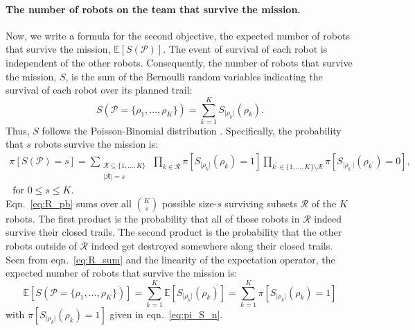 \documentclass[11pt, oneside]{article}
\begin{document}
\paragraph{The number of robots on the team that survive the mission.} 
Now, we write a formula for the second objective, the expected number of robots that survive the mission, $\mathbb{E}[S(\mathcal{P})]$.
The event of survival of each robot is independent of the other robots.
Consequently, the number of robots that survive the mission, $S$, is the sum of the Bernoulli random variables indicating the survival of each robot over its planned trail:
\begin{equation}
	S(\mathcal{P}=\{\rho_1, ..., \rho_K\})=\sum_{k=1}^K S_{\lvert \rho_k \rvert}(\rho_k). \label{eq:R_sum}
\end{equation}
Thus, $S$ follows the Poisson-Binomial distribution \cite{tang2023poisson}.
Specifically, the probability that $s$ robots survive the mission is:
\begin{multline}
	\pi[S(\mathcal{P})=s] = \sum_{\substack{\mathcal{R} \subseteq \{1, ..., K\}  \\ \lvert \mathcal{R} \rvert = s} } \,
	\prod_{k \in \mathcal{R}} \pi[S_{\lvert \rho_k \rvert}(\rho_k) = 1]
	\prod_{k^\prime \in \{1, ..., K\} \setminus \mathcal{R}}
	 \pi[S_{\lvert \rho_{k^\prime} \rvert}(\rho_{k^\prime}) = 0]
	 , \\ \text{ for } 0 \leq s \leq K.
	\label{eq:R_pb}
\end{multline}
Eqn.~\ref{eq:R_pb} sums over all $\binom{K}{s}$ possible size-$s$ surviving subsets $\mathcal{R}$ of the $K$ robots. The first product is the probability that all of those robots in $\mathcal{R}$ indeed survive their closed trails. The second product is the probability that the other robots outside of $\mathcal{R}$ indeed get destroyed somewhere along their closed trails.
Seen from eqn.~\ref{eq:R_sum} and the linearity of the expectation operator, the expected number of robots that survive the mission is:
\begin{equation}
	\mathbb{E}[S(\mathcal{P}=\{\rho_1, ..., \rho_K\})]=\sum_{k=1}^K \mathbb{E}[S_{\lvert \rho_k \rvert}(\rho_k)] = \sum_{k=1}^K  \pi[S_{\lvert \rho_k \rvert}(\rho_k) = 1] \label{eq:formula_obj2}
\end{equation} with $\pi[S_{\lvert \rho_k \rvert}(\rho_k) = 1]$ given in eqn.~\ref{eq:pi_S_n}.
\end{document}
